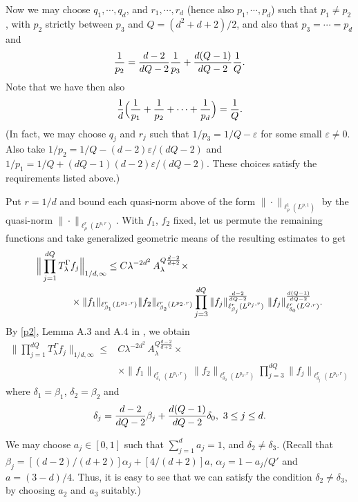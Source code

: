 \documentclass[11 pt]{amsart}
\theoremstyle{plain}
\numberwithin{equation}{section}
\theoremstyle{plain}
\numberwithin{equation}{section}
\theoremstyle{remark}
\begin{document}
Now we may choose $q_1, \cdots, q_d$, and $r_1, \cdots ,r_d$
(hence also $p_1, \cdots, p_d$) such that $p_1 \not= p_2$, with
$p_2$ strictly between $p_3$ and $Q = (d^2 + d + 2)/2$, and also that $ p_3 = \cdots = p_d$ and
\begin{align}\label{p2} {1\over p_2} = {d-2 \over d Q -2} {1\over p_3} + {d(Q-1) \over dQ-2} {1\over Q} .
\end{align}
Note that we have then also
$$ {1\over d} \Big({1\over p_1} + {1\over p_2} + \cdots + {1 \over p_d}\Big) = {1\over Q} .$$
(In fact, we may choose $q_j$ and $r_j$ such that $1/p_3 = 1/Q-\varepsilon$
for some small $\varepsilon \not= 0$.
Also take $1/p_2 = 1/Q - (d-2)\varepsilon/(dQ-2)$ and $1/p_1 = 1/Q + (dQ-1)(d-2)\varepsilon/(dQ-2)$.
These choices satisfy the requirements listed above.)

Put $r=1/d$ and bound each quasi-norm above of the form
$\|\cdot\|_{\ell^1_{\rho} (L^{p,1})}$  by the quasi-norm
$\|\cdot\|_{\ell^r_{\rho} (L^{p,r})}$. With $f_1$, $f_2$ fixed, let us permute the remaining functions and take generalized geometric means of the resulting estimates to get
\begin{align*}\label{}
\Big\| \prod_{j=1}^{dQ} T_{\lambda}^{\Gamma} & f_j \Big\|_{1/d ,\infty}
\le C{\lambda}^{-2 d^2}
\,A_{\lambda}^{Q\frac{d-2}{d+2}} \times \\
&\times \| f_1 \|_{\ell^r_{\beta_1} (L^{p_1,r})} \| f_2
\|_{\ell^r_{\beta_2} (L^{p_2,r})} \prod_{j=3}^{dQ} \| f_j
\|_{\ell^r_{\beta_j} (L^{p_j,r})}^{d-2 \over dQ-2}\ \| f_j
\|_{\ell^r_{\delta_0} (L^{Q,r})}^{d(Q-1) \over dQ-2} .
\end{align*}
By \eqref{p2}, Lemma A.3 and A.4 in \cite{BOS3}, we obtain
\begin{align*}\label{}
\Big\| \prod_{j=1}^{dQ} T_{\lambda}^{\Gamma} f_j \Big\|_{1/d ,\infty}
\le &C{\lambda}^{-2 d^2}
\,A_{\lambda}^{Q\frac{d-2}{d+2}} \times \\
&\times \| f_1 \|_{\ell^r_{\delta_1} (L^{p_1,r})} \| f_2
\|_{\ell^r_{\delta_2} (L^{p_2,r})} \prod_{j=3}^{dQ} \| f_j
\|_{\ell^r_{\delta_j} (L^{p_2,r})}
\end{align*}
where $\delta_1 = \beta_1$, $\delta_2 = \beta_2$ and
\[ \delta_j = {d-2 \over dQ-2} \beta_j + {d(Q-1) \over dQ-2} \delta_0, ~ 3\le j\le d .
\]

We may choose $a_j \in [0,1]$ such that
$\sum_{j=1}^d a_j=1$, and
$\delta_2 \not= \delta_3$. (Recall that
$\beta_j = [(d-2)/(d+2)] \alpha_j + [4/(d+2)] a$, $ \alpha_j = 1 - a_j/Q'$
and $a = (3-d)/4$. Thus, it is easy to see that we can satisfy the condition $\delta_2 \not= \delta_3$, by choosing $a_2$ and $a_3$ suitably.)
\end{document}
